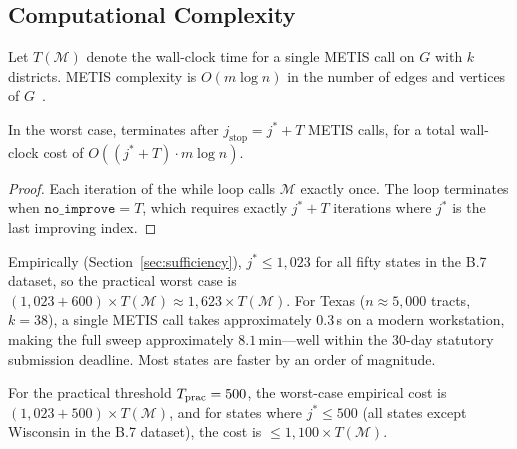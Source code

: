 \subsection{Computational Complexity}

Let $T(\mathcal{M})$ denote the wall-clock time for a single METIS call on
$G$ with $k$ districts.
METIS complexity is $O(m \log n)$ in the number of edges and vertices of
$G$~\citep{karypis1998}.

\begin{proposition}[Complexity]
\label{prop:complexity}
In the worst case, \cs{} terminates after $j_{\mathrm{stop}} = j^* + T$ METIS
calls, for a total wall-clock cost of $O((j^* + T) \cdot m \log n)$.
\end{proposition}

\begin{proof}
Each iteration of the while loop calls $\mathcal{M}$ exactly once.
The loop terminates when $\mathtt{no\_improve} = T$, which requires exactly
$j^* + T$ iterations where $j^*$ is the last improving index.
\end{proof}

Empirically (Section~\ref{sec:sufficiency}), $j^* \le 1{,}023$ for all fifty
states in the B.7 dataset, so the practical worst case is
$(1{,}023 + 600) \times T(\mathcal{M}) \approx 1{,}623 \times T(\mathcal{M})$.
For Texas ($n \approx 5{,}000$ tracts, $k = 38$), a single METIS call takes
approximately $0.3$\,s on a modern workstation, making the full sweep
approximately $8.1$\,min---well within the 30-day statutory submission deadline.
Most states are faster by an order of magnitude.

For the practical threshold $T_{\mathrm{prac}} = 500$, the worst-case empirical cost
is $(1{,}023 + 500) \times T(\mathcal{M})$, and for states where $j^* \le 500$
(all states except Wisconsin in the B.7 dataset), the cost is
$\le 1{,}100 \times T(\mathcal{M})$.
